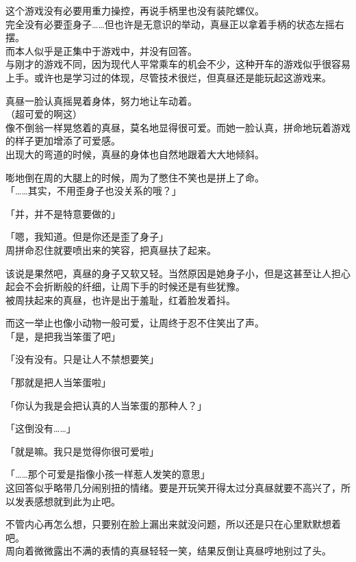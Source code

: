 这个游戏没有必要用重力操控，再说手柄里也没有装陀螺仪。\\

完全没有必要歪身子……但也许是无意识的举动，真昼正以拿着手柄的状态左摇右摆。\\

而本人似乎是正集中于游戏中，并没有回答。\\

与刚才的游戏不同，因为现代人平常乘车的机会不少，这种开车的游戏似乎很容易上手。或许也是学习过的体现，尽管技术很烂，但真昼还是能玩起这游戏来。

真昼一脸认真摇晃着身体，努力地让车动着。\\

（超可爱的啊这）\\

像不倒翁一样晃悠着的真昼，莫名地显得很可爱。而她一脸认真，拼命地玩着游戏的样子更加增添了可爱感。\\

出现大的弯道的时候，真昼的身体也自然地跟着大大地倾斜。

嘭地倒在周的大腿上的时候，周为了憋住不笑也是拼上了命。\\

「……其实，不用歪身子也没关系的哦？」

「并，并不是特意要做的」

「嗯，我知道。但是你还是歪了身子」\\

周拼命忍住就要喷出来的笑容，把真昼扶了起来。

该说是果然吧，真昼的身子又软又轻。当然原因是她身子小，但是这甚至让人担心起会不会折断般的纤细，让周下手的时候还是有些犹豫。\\

被周扶起来的真昼，也许是出于羞耻，红着脸发着抖。

而这一举止也像小动物一般可爱，让周终于忍不住笑出了声。\\

「是，是把我当笨蛋了吧」

「没有没有。只是让人不禁想要笑」

「那就是把人当笨蛋啦」

「你认为我是会把认真的人当笨蛋的那种人？」

「这倒没有……」

「就是嘛。我只是觉得你很可爱啦」

「……那个可爱是指像小孩一样惹人发笑的意思」\\

这回答似乎略带几分闹别扭的情绪。要是开玩笑开得太过分真昼就要不高兴了，所以发表感想就到此为止吧。

不管内心再怎么想，只要别在脸上漏出来就没问题，所以还是只在心里默默想着吧。\\

周向着微微露出不满的表情的真昼轻轻一笑，结果反倒让真昼哼地别过了头。
